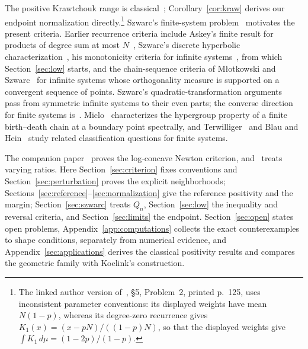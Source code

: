 The positive Krawtchouk range is classical~\cite{eagleson,dunkl,szwarc}; Corollary~\ref{cor:kraw} derives our endpoint normalization directly.\footnote{The linked author version of~\cite{szwarc}, \S5, Problem~2, printed p.~125, uses inconsistent parameter conventions: its displayed weights have mean $N(1-p)$, whereas its degree-zero recurrence gives $K_1(x)=(x-pN)/((1-p)N)$, so that the displayed weights give $\int K_1\,d\mu=(1-2p)/(1-p)$.} Szwarc's finite-system problem~\cite[\S5, Problem~2]{szwarc} motivates the present criteria. Earlier recurrence criteria include Askey's finite result for products of degree sum at most $N$~\cite[Part~II, Theorem~1 and Corollary~1]{askey}, Szwarc's discrete hyperbolic characterization~\cite[Theorem~1]{szwarc2003}, his monotonicity criteria for infinite systems~\cite[Theorems~3.2--3.4]{szwarc}, from which Section~\ref{sec:low} starts, and the chain-sequence criteria of M{\l}otkowski and Szwarc~\cite{mlotszwarc} for infinite systems whose orthogonality measure is supported on a convergent sequence of points. Szwarc's quadratic-transformation arguments~\cite{szwarc1992,szwarc1996} pass from symmetric infinite systems to their even parts; the converse direction for finite systems is~\cite[Theorem~]{P1}. Miclo~\cite[Proposition~3.3]{miclo} characterizes the hypergroup property of a finite birth--death chain at a boundary point spectrally, and Terwilliger~\cite[Problems~36.4 and~36.5]{terwilliger} and Blau and Hein~\cite[Theorem~1.1]{blauhein} study related classification questions for finite systems.

The companion paper~\cite{P1} proves the log-concave Newton criterion, and~\cite{P2} treats varying ratios. Here Section~\ref{sec:criterion} fixes conventions and Section~\ref{sec:perturbation} proves the explicit neighborhoods; Sections~\ref{sec:reference}--\ref{sec:normalization} give the reference positivity and the margin; Section~\ref{sec:szwarc} treats $Q_n$, Section~\ref{sec:low} the inequality and reversal criteria, and Section~\ref{sec:limits} the endpoint. Section~\ref{sec:open} states open problems, Appendix~\ref{app:computations} collects the exact counterexamples to shape conditions, separately from numerical evidence, and Appendix~\ref{sec:applications} derives the classical positivity results and compares the geometric family with Koelink's construction.

